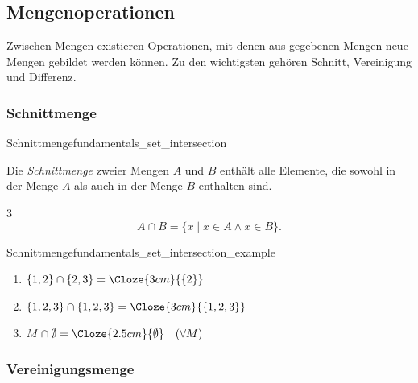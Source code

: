 \clearpage
\subsection{Mengenoperationen}
\label{subsec:fundamentals_set_operations}

Zwischen Mengen existieren Operationen, mit denen aus gegebenen Mengen neue
Mengen gebildet werden können. Zu den wichtigsten gehören Schnitt, Vereinigung
und Differenz.

\subsubsection{Schnittmenge}
\label{subsubsec:fundamentals_set_intersection}

\noindent\begin{minipage}{\linewidth}
\begin{DefinitionBox}{Schnittmenge}{fundamentals_set_intersection}
  \begin{minipage}[c]{0.70\linewidth}
    Die \emph{Schnittmenge}  zweier Mengen $A$ und
    $B$ enthält alle Elemente, die sowohl in der Menge $A$ als auch in der
    Menge $B$ enthalten sind.
    \begin{ClozeArea}[24]{3}
      \[
        A\cap B=\{x\mid x\in A\land x\in B\}.
      \]
    \end{ClozeArea}
  \end{minipage}\hfill
  \begin{minipage}[c]{0.25\linewidth}
    \centering
  \end{minipage}
\end{DefinitionBox}

\begin{ExampleBox}{Schnittmenge}{fundamentals_set_intersection_example}
  \begin{enumerate}[label=\alph*),itemsep=0.6em]
    \item $\{1,2\}\cap\{2,3\}=\Cloze{3cm}{\{2\}}$
    \item $\{1,2,3\}\cap\{1,2,3\}=\Cloze{3cm}{\{1,2,3\}}$
    \item $M\cap\emptyset=\Cloze{2.5cm}{\emptyset}\quad(\forall M)$
  \end{enumerate}
\end{ExampleBox}
\end{minipage}



\subsubsection{Vereinigungsmenge}
\label{subsubsec:fundamentals_set_union}

